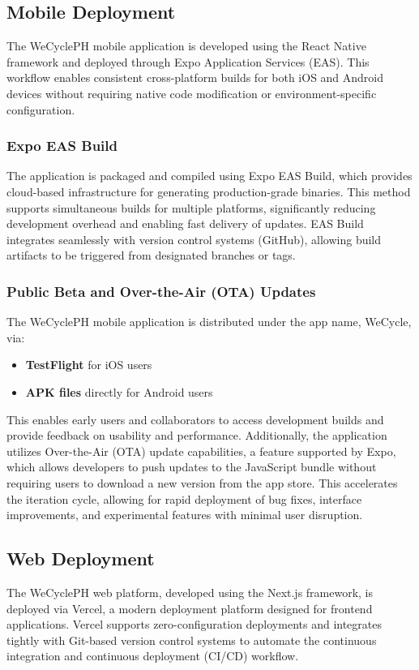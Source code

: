 \subsection{Mobile Deployment}
The WeCyclePH mobile application is developed using the React Native framework and deployed through Expo Application Services (EAS). This workflow enables consistent cross-platform builds for both iOS and Android devices without requiring native code modification or environment-specific configuration.

\subsubsection{Expo EAS Build}
The application is packaged and compiled using Expo EAS Build, which provides cloud-based infrastructure for generating production-grade binaries. This method supports simultaneous builds for multiple platforms, significantly reducing development overhead and enabling fast delivery of updates. EAS Build integrates seamlessly with version control systems (GitHub), allowing build artifacts to be triggered from designated branches or tags.

\subsubsection{Public Beta and Over-the-Air (OTA) Updates}
The WeCyclePH mobile application is distributed under the app name, WeCycle, via:
\begin{itemize}
\item \textbf{TestFlight} for iOS users
\item \textbf{APK files} directly for Android users
\end{itemize}

This enables early users and collaborators to access development builds and provide feedback on usability and performance. Additionally, the application utilizes Over-the-Air (OTA) update capabilities, a feature supported by Expo, which allows developers to push updates to the JavaScript bundle without requiring users to download a new version from the app store. This accelerates the iteration cycle, allowing for rapid deployment of bug fixes, interface improvements, and experimental features with minimal user disruption.



\subsection{Web Deployment}
The WeCyclePH web platform, developed using the Next.js framework, is deployed via Vercel, a modern deployment platform designed for frontend applications. Vercel supports zero-configuration deployments and integrates tightly with Git-based version control systems to automate the continuous integration and continuous deployment (CI/CD) workflow.

